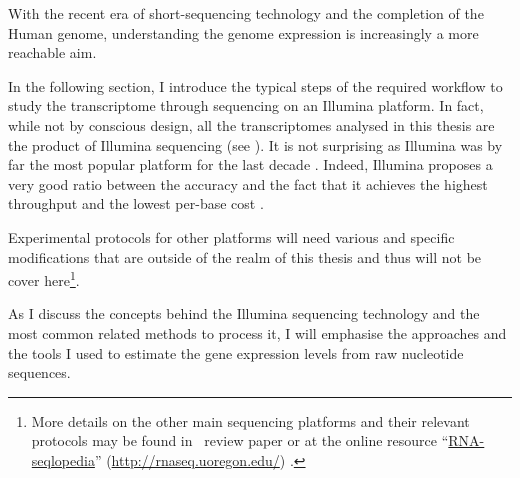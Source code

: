 With the recent era of short-sequencing technology and the completion of the
Human genome, understanding the genome expression is increasingly a more
reachable aim.

\begin{comment}
While microarrays are measuring many \mRNAs\ at once, their number is limited,

\TK{history of \Rnaseq.}
In the past decade, \gls{RNA-Seq} technology has risen as the method of choice
for  transcriptome.

Many methods and technologies through the years but more recently, boom of study:
next generation sequencing (1st generation, 2nd generation and 3rd)\ldots So
much that now the expression doesn't mean anything.

Completion of the Human genome project : key changer: probes with microarrays
possible (as there were then template). Next key changer: shotgun sequencing
instead of Sanger sequencing (slow). + advance in computer science: needs of
parallelisation and storage.

So, In 2008, shift from microarrays to \Rnaseq.

\clearpage

\end{comment}

In the following section, I introduce the typical steps of the required workflow
to study the transcriptome through sequencing on an Illumina platform. In fact,
while not by conscious design, all the transcriptomes analysed in this thesis are
the product of Illumina sequencing (see
).
It is not surprising as Illumina was by far
the most popular platform for the last decade .
Indeed, Illumina proposes a very
good ratio between the accuracy and the fact that it achieves the highest
throughput and the lowest per-base cost .

Experimental protocols for other platforms will need various and specific
modifications that are outside of the realm of this thesis and thus will not be
cover here\footnote{More details on the other main sequencing platforms and their
relevant protocols may be found in~\cite{rnaseqProtocols} review paper or at the
online resource \enquote{\href{http://rnaseq.uoregon.edu/}{RNA-seqlopedia}}
(\href{http://rnaseq.uoregon.edu/}{http://rnaseq.uoregon.edu/})
.}.

As I discuss the concepts behind the Illumina sequencing technology and the
most common related methods to process it, I will emphasise the approaches and
the tools I used to estimate the gene expression levels from raw nucleotide
sequences.

